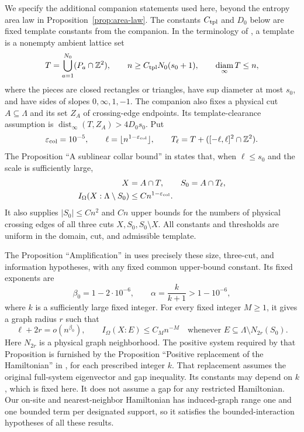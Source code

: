 \documentclass[11pt]{article}
\numberwithin{equation}{section}
\theoremstyle{definition}
\theoremstyle{remark}
\DeclareMathOperator{\dist}{dist}
\DeclareMathOperator{\diam}{diam}
\begin{document}
We specify the additional companion statements used here, beyond the
entropy area law in Proposition~\ref{prop:area-law}.  The constants
$C_{\rm tpl}$ and $D_0$ below are fixed template constants from the companion.
In the terminology
of \cite[Sections~9 and~10]{RepoAreaLaw}, a template is a nonempty ambient
lattice set
\[
 T=\bigcup_{a=1}^{N_0}(P_a\cap\mathbb Z^2),
 \qquad
 n\ge C_{\rm tpl}N_0(s_0+1),
 \qquad \diam_\infty T\le n,
\]
where the pieces are closed rectangles or triangles, have sup diameter
at most $s_0$, and have sides of slopes $0,\infty,1,-1$.  The companion also
fixes a physical cut $A\subseteq\Lambda$ and its set $Z_A$ of
crossing-edge endpoints.  Its template-clearance assumption is
$\dist_\infty(T,Z_A)>4D_0s_0$.  Put
\[
 \varepsilon_{\rm col}=10^{-5},\qquad
 \ell=\lfloor n^{1-\varepsilon_{\rm col}}\rfloor,
 \qquad T_\ell=T+([-\ell,\ell]^2\cap\mathbb Z^2).
\]
The Proposition ``A sublinear collar bound'' in
\cite[Section~9]{RepoAreaLaw} states that, when $\ell\le s_0$ and the
scale is sufficiently large,
\begin{equation}
 \begin{split}
 X&=A\cap T,\qquad S_0=A\cap T_\ell,\\
 I_\Omega(X:\Lambda\setminus S_0)&\le Cn^{1-\varepsilon_{\rm col}}.
 \end{split}
 \label{eq:info-repository-collar}
\end{equation}
It also supplies $|S_0|\le Cn^2$ and $Cn$ upper bounds for the numbers
of physical crossing edges of all three cuts $X,S_0,S_0\setminus X$.
All constants and thresholds are uniform in the domain, cut, and
admissible template.

The Proposition ``Amplification'' in \cite[Section~10]{RepoAreaLaw}
uses precisely these size, three-cut, and information hypotheses, with
any fixed common upper-bound constant.  Its fixed exponents are
\[
 \beta_0=1-2\cdot10^{-6},\qquad
 \alpha=\frac{k}{k+1}>1-10^{-6},
\]
where $k$ is a sufficiently large fixed integer.  For every fixed integer
$M\ge1$, it gives a graph radius $r$ such that
\begin{equation}
 \ell+2r=o(n^{\beta_0}),\qquad
 I_\Omega(X:E)\le C_Mn^{-M}
 \quad\text{whenever }E\subseteq\Lambda\setminus N_{2r}(S_0).
 \label{eq:info-repository-amplification}
\end{equation}
Here $N_{2r}$ is a physical graph neighborhood.  The positive system
required by that Proposition is furnished by the Proposition ``Positive
replacement of the Hamiltonian'' in \cite[Section~4]{RepoAreaLaw}, for
each prescribed integer $k$.  That replacement assumes the original
full-system eigenvector and gap inequality.  Its constants may depend
on $k$, which is fixed here.  It does not assume a gap for any restricted
Hamiltonian.  Our on-site and nearest-neighbor Hamiltonian has
induced-graph range one and one bounded term per designated support, so
it satisfies the bounded-interaction hypotheses of all these results.
\end{document}
